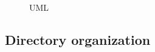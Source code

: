 \documentclass[conference]{IEEEtran}
\begin{document}
\begin{figure}[h]
    \centering
    \caption{UML}
    \label{fig:Display}
\end{figure}
\clearpage

\subsection{Directory organization}
\end{document}
